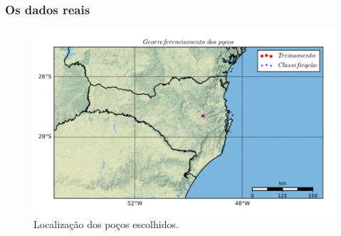 \documentclass[aspectratio=10]{beamer} %
\begin{document}
\begin{frame}
	\frametitle{Os dados reais}
	\begin{figure}[H]
		\centering
		\includegraphics[scale=0.5]{Imagens/locmap02.pdf}
		\caption{Localização dos poços escolhidos.}
		\label{loc02}
	\end{figure}
\end{frame}
\end{document}
